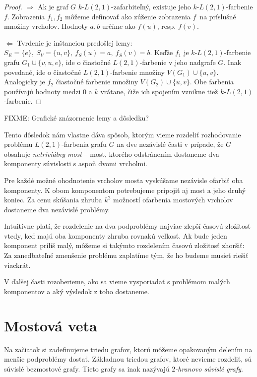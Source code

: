 \begin{proof}
    $\boxed{\Rightarrow}$
        Ak je graf $G$ $k$-$L(2,1)$-zafarbiteľný, existuje jeho $k$-$L(2,1)$-farbenie $f$. Zobrazenia $f_1, f_2$ môžeme
        definovať ako zúženie zobrazenia $f$ na príslušné množiny vrcholov. Hodnoty $a, b$ určíme ako $f(u)$, resp. $f(v)$.

    $\boxed{\Leftarrow}$
        Tvrdenie je inštanciou predošlej lemy: $S_E = \{e\},\ S_V = \{u,v\},\ f_S(u) = a,\ f_S(v) = b$. Keďže $f_1$
        je $k$-$L(2,1)$-farbenie grafu $G_1 \cup \{v, u, e\}$, ide o čiastočné $L(2,1)$-farbenie v jeho nadgrafe $G$.
        Inak povedané, ide o číastočné $L(2,1)$-farbenie množiny $V(G_1) \cup \{u, v\}$. Analogicky je $f_2$ čiastočné
        farbenie množiny $V(G_2) \cup \{u,v\}$. Obe farbenia používajú hodnoty medzi $0$ a $k$ vrátane, čiže ich
        spojením vznikne tiež $k$-$L(2,1)$-farbenie.
\end{proof}

FIXME: Grafické znázornenie lemy a dôsledku? %

Tento dôsledok nám vlastne dáva spôsob, ktorým vieme rozdeliť rozhodovanie
problému $L(2,1)$-farbenia grafu $G$ na dve nezávislé časti v prípade,
že $G$ obsahuje \emph{netriviálny most} -- most, ktorého odstránením dostaneme
dva komponenty súvislosti s aspoň dvomi vrcholmi.

Pre každé možné ohodnotenie vrcholov mosta vyskúšame nezávisle ofarbiť oba
komponenty. K obom komponentom potrebujeme pripojiť aj most a jeho druhý koniec. Za cenu
skúšania zhruba $k^2$ možností ofarbenia mostových vrcholov dostaneme dva nezávislé
problémy.

Intuitívne platí, že rozdelenie na dva podproblémy
najviac zlepší časovú zložitosť vtedy, keď majú oba komponenty zhruba rovnakú veľkosť.
Ak bude jeden komponent príliš malý, môžeme si takýmto rozdelením časovú zložitosť zhoršiť:
Za zanedbateľné zmenšenie problému zaplatíme tým, že ho budeme musieť riešiť viackrát.

V ďalšej časti rozoberieme, ako sa vieme vysporiadať s problémom malých komponentov a
aký výsledok z toho dostaneme.

\section{Mostová veta}

Na začiatok si zadefinujeme triedu grafov, ktorú môžeme opakovaným delením na menšie
podproblémy dostať. Základnou triedou grafov, ktoré nevieme rozdeliť, sú súvislé
bezmostové grafy. Tieto grafy sa inak nazývajú \emph{$2$-hranovo súvislé grafy}.

